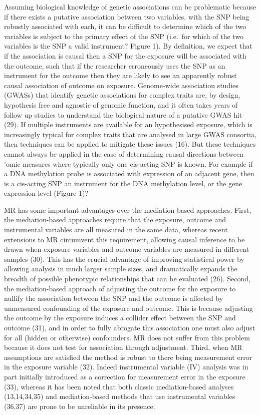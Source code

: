 \documentclass[]{article}
\begin{document}
Assuming biological knowledge of genetic associations can be problematic
because if there exists a putative association between two variables,
with the SNP being robustly associated with each, it can be difficult to
determine which of the two variables is subject to the primary effect of
the SNP (i.e.~for which of the two variables is the SNP a valid
instrument? Figure 1). By definition, we expect that if the association
is causal then a SNP for the exposure will be associated with the
outcome, such that if the researcher erroneously uses the SNP as an
instrument for the outcome then they are likely to see an apparently
robust causal association of outcome on exposure. Genome-wide
association studies (GWASs) that identify genetic associations for
complex traits are, by design, hypothesis free and agnostic of genomic
function, and it often takes years of follow up studies to understand
the biological nature of a putative GWAS hit (29). If multiple
instruments are available for an hypothesised exposure, which is
increasingly typical for complex traits that are analysed in large GWAS
consortia, then techniques can be applied to mitigate these issues (16).
But these techniques cannot always be applied in the case of determining
causal directions between 'omic measures where typically only one
cis-acting SNP is known. For example if a DNA methylation probe is
associated with expression of an adjacent gene, then is a cis-acting SNP
an instrument for the DNA methylation level, or the gene expression
level (Figure 1)?

MR has some important advantages over the mediation-based approaches.
First, the mediation-based approaches require that the exposure, outcome
and instrumental variables are all measured in the same data, whereas
recent extensions to MR circumvent this requirement, allowing causal
inference to be drawn when exposure variables and outcome variables are
measured in different samples (30). This has the crucial advantage of
improving statistical power by allowing analysis in much larger sample
sizes, and dramatically expands the breadth of possible phenotypic
relationships that can be evaluated (26). Second, the mediation-based
approach of adjusting the outcome for the exposure to nullify the
association between the SNP and the outcome is affected by unmeasured
confounding of the exposure and outcome. This is because adjusting the
outcome by the exposure induces a collider effect between the SNP and
outcome (31), and in order to fully abrogate this association one must
also adjust for all (hidden or otherwise) confounders. MR does not
suffer from this problem because it does not test for association
through adjustment. Third, when MR assumptions are satisfied the method
is robust to there being measurement error in the exposure variable
(32). Indeed instrumental variable (IV) analysis was in part initially
introduced as a correction for measurement error in the exposure (33),
whereas it has been noted that both classic mediation-based analyses
(13,14,34,35) and mediation-based methods that use instrumental
variables (36,37) are prone to be unreliable in its presence.
\end{document}
